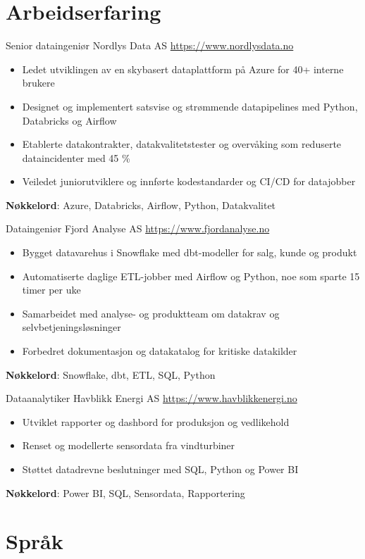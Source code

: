 \documentclass[a4paper, serif, 10pt]{moderncv}
\begin{document}
\section{Arbeidserfaring}

        {Senior dataingeniør}
        {Nordlys Data AS}
        {\url{https://www.nordlysdata.no}}
        {}
        {\begin{itemize}
\item Ledet utviklingen av en skybasert dataplattform på Azure for 40+ interne brukere
\item Designet og implementert satsvise og strømmende datapipelines med Python, Databricks og Airflow
\item Etablerte datakontrakter, datakvalitetstester og overvåking som reduserte dataincidenter med 45 \%
\item Veiledet juniorutviklere og innførte kodestandarder og CI/CD for datajobber
\end{itemize}
\textbf{Nøkkelord}: Azure, Databricks, Airflow, Python, Datakvalitet}

        {Dataingeniør}
        {Fjord Analyse AS}
        {\url{https://www.fjordanalyse.no}}
        {}
        {\begin{itemize}
\item Bygget datavarehus i Snowflake med dbt-modeller for salg, kunde og produkt
\item Automatiserte daglige ETL-jobber med Airflow og Python, noe som sparte 15 timer per uke
\item Samarbeidet med analyse- og produktteam om datakrav og selvbetjeningsløsninger
\item Forbedret dokumentasjon og datakatalog for kritiske datakilder
\end{itemize}
\textbf{Nøkkelord}: Snowflake, dbt, ETL, SQL, Python}

        {Dataanalytiker}
        {Havblikk Energi AS}
        {\url{https://www.havblikkenergi.no}}
        {}
        {\begin{itemize}
\item Utviklet rapporter og dashbord for produksjon og vedlikehold
\item Renset og modellerte sensordata fra vindturbiner
\item Støttet datadrevne beslutninger med SQL, Python og Power BI
\end{itemize}
\textbf{Nøkkelord}: Power BI, SQL, Sensordata, Rapportering}
\section{Språk}
\end{document}
